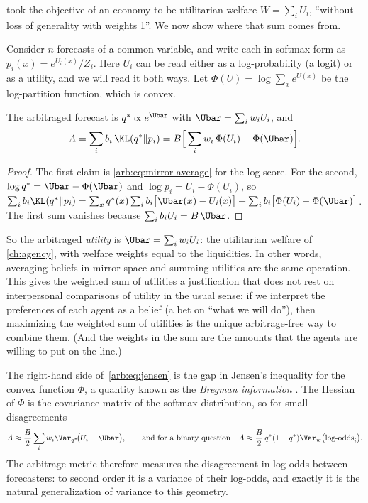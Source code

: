 \begin{draftblock}
 took the objective of an economy to be utilitarian welfare $W=\sum_iU_i$, ``without loss of generality with weights 1''. We now show where that sum comes from.

Consider $n$ forecasts of a common variable, and write each in softmax form as $p_i(x)=e^{U_i(x)}/Z_i$. Here $U_i$ can be read either as a log-probability (a logit) or as a utility, and we will read it both ways. Let $\Phi(U)=\log\sum_xe^{U(x)}$ be the log-partition function, which is convex.

\begin{proposition}\label{arb:prop:welfare}
The arbitraged forecast is $q^*\propto e^{\Ubar}$ with $\Ubar=\sum_iw_iU_i$, and
\begin{equation}\label{arb:eq:jensen}
A=\sum_ib_i\,\KL(q^*\|p_i)=B\Big[\sum_iw_i\,\Phi(U_i)-\Phi(\Ubar)\Big].
\end{equation}
\end{proposition}

\begin{proof}
The first claim is \eqref{arb:eq:mirror-average} for the log score. For the second, $\log q^*=\Ubar-\Phi(\Ubar)$ and $\log p_i=U_i-\Phi(U_i)$, so
$\sum_ib_i\KL(q^*\|p_i)=\sum_x q^*(x)\sum_ib_i\big[\Ubar(x)-U_i(x)\big]+\sum_ib_i\big[\Phi(U_i)-\Phi(\Ubar)\big]$.
The first sum vanishes because $\sum_ib_iU_i=B\,\Ubar$.
\end{proof}

So the arbitraged \emph{utility} is $\Ubar=\sum_iw_iU_i$: the utilitarian welfare of \cref{ch:agency}, with welfare weights equal to the liquidities. In other words, averaging beliefs in mirror space and summing utilities are the same operation. This gives the weighted sum of utilities a justification that does not rest on interpersonal comparisons of utility in the usual sense: if we interpret the preferences of each agent as a belief (a bet on ``what we will do''), then maximizing the weighted sum of utilities is the unique arbitrage-free way to combine them. (And the weights in the sum are the amounts that the agents are willing to put on the line.)

The right-hand side of~\eqref{arb:eq:jensen} is the gap in Jensen's inequality for the convex function $\Phi$, a quantity known as the \emph{Bregman information} \citep{banerjeeClusteringBregmanDivergences2005}. The Hessian of $\Phi$ is the covariance matrix of the softmax distribution, so for small disagreements
\[
A\approx\frac B2\sum_iw_i\Var_{q^*}\!\big(U_i-\Ubar\big),\qquad\text{and for a binary question}\quad A\approx\frac B2\,q^*(1-q^*)\Var_w\big(\text{log-odds}_i\big).
\]
The arbitrage metric therefore measures the disagreement in log-odds between forecasters: to second order it is a variance of their log-odds, and exactly it is the natural generalization of variance to this geometry.


\end{draftblock}
